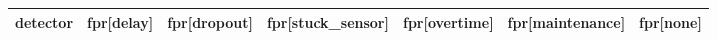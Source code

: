 \begin{tabular}{lrrrrrr}
\toprule
detector & fpr[delay] & fpr[dropout] & fpr[stuck\_sensor] & fpr[overtime] & fpr[maintenance] & fpr[none] \\
\midrule
\bottomrule
\end{tabular}
